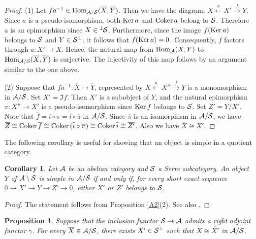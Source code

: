 \documentclass[11pt]{amsart}
\newtheorem{corollary}[theorem]{Corollary}
\newtheorem{proposition}[theorem]{Proposition}
\theoremstyle{definition}
\numberwithin{equation}{section}
\begin{document}
\begin{proof}
(1) Let $f a^{-1} \in \HomAS (\overline{X}, \overline{Y})$. 
Then we have the diagram: $X \xleftarrow{a} X' \xrightarrow{f} Y$. 
Since $a$ is a pseudo-isomorphism, both $\Ker a$ and $\Coker a$ belong to $\SS$. 
Therefore $a$ is an epimorphism since $X \in {}^{\perp}\! \SS$.
Furthermore, since the image $f(\Ker a)$ belongs to $\SS$ and $Y \in \SS^{\perp}$, it follows that $f(\Ker a) = 0$. 
Consequently, $f$ factors through $a : X' \to X$. 
Hence, the natural map from $\HomA (X, Y)$ to $\HomAS (\overline{X}, \overline{Y})$ is surjective. 
The injectivity of this map follows by an argument similar to the one above. 


(2) Suppose that $f a^{-1}: \overline{X} \to \overline{Y}$, represented by $X \xleftarrow{a} X'' \xrightarrow{f} Y$ is a monomorphism in $\AA/ \SS$. 
Set $X' = \Im f$. 
Then $X'$ is a subobject of $Y$, and the natural epimorphism $\pi : X'' \to X'$ is a pseudo-isomorphism since $\Ker f$ belongs to $\SS$. 
Set $Z' = Y/ X'$. 
Note that $\overline{f} =\overline{i \circ \pi}= \overline{i} \circ \overline{\pi}$ in $\AA/\SS$. 
Since $\overline{\pi}$ is an isomorphism in $\AA/\SS$, we have $\overline{Z} \cong \Coker \overline{f} \cong \Coker ( \overline{i} \circ \overline{\pi}) \cong \Coker \overline{i} \cong \overline{Z'}$. 
Also we have $\overline{X} \cong \overline{X'}$. 
\end{proof}


The following corollary is useful for showing that an object is simple in a quotient category. 

\begin{corollary}\label{A4}
Let $\AA$ be an abelian category and $\SS$ a Serre subcategory. 
An object $Y$ of $\AA \setminus \SS$ is simple in $\AA/ \SS$ if and only if, for every short exact sequence $0 \to X' \to Y \to Z' \to 0$, either $X'$ or $Z'$ belongs to $\SS$. 
\end{corollary}		


\begin{proof}
The statement follows from Proposition \ref{A2}(2). 
See also \cite[Lemma 1.1]{GR74}. 
\end{proof}



\begin{proposition}\label{A5}
Suppose that the inclusion functor $\SS \to \AA$ admits a right adjoint functor $\gamma$. 
For every $\overline{X} \in \AA/ \SS$, there exists $X' \in \SS ^{\perp}$ such that $\overline{X} \cong \overline{X'}$ in $\AA/\SS$. 
\end{proposition}
\end{document}
